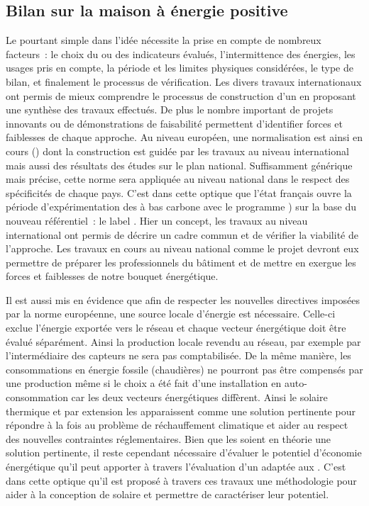 \subsection{Bilan sur la maison à énergie positive} %
\label{sub:bilan_sur_la_BEPOS}
Le  pourtant simple dans l’idée nécessite la prise en compte de nombreux
facteurs~: le choix du ou des indicateurs évalués, l’intermittence des énergies, les
usages pris en compte, la période et les limites physiques considérées, le type de bilan,
et finalement le processus de vérification. Les divers travaux internationaux ont permis
de mieux comprendre le processus de construction d’un  en proposant une
synthèse des travaux effectués. De plus le nombre important de projets innovants ou de
démonstrations de faisabilité permettent d’identifier forces et faiblesses de chaque
approche. Au niveau européen, une normalisation est ainsi en cours ()
dont la construction est guidée par les travaux au niveau international mais aussi des
résultats des études sur le plan national. Suffisamment générique mais précise, cette
norme sera appliquée au niveau national dans le respect des spécificités de chaque pays.
C’est dans cette optique que l’état français ouvre la période d’expérimentation des
 à bas carbone avec le programme ) sur la base du nouveau référentiel~: le label .
Hier un concept, les travaux au niveau international ont permis de décrire un cadre commun
et de vérifier la viabilité de l’approche. Les travaux en cours au niveau national comme
le projet  devront eux permettre de préparer les professionnels du bâtiment
et de mettre en exergue les forces et faiblesses de notre bouquet énergétique.

Il est aussi mis en évidence que afin de respecter les nouvelles directives imposées par
la norme européenne, une source locale d’énergie est nécessaire. Celle-ci exclue l’énergie
exportée vers le réseau et chaque vecteur énergétique doit être évalué séparément. Ainsi
la production locale revendu au réseau, par exemple par l’intermédiaire des capteurs
 ne sera pas comptabilisée. De la même manière, les consommations en énergie
fossile (chaudières) ne pourront pas être compensés par une production
 même si le choix a été fait d’une installation en
auto-consommation car les deux vecteurs énergétiques diffèrent. Ainsi le solaire thermique
et par extension les  apparaissent comme une solution pertinente pour répondre à
la fois au problème de réchauffement climatique et aider au respect des nouvelles
contraintes réglementaires. Bien que les  soient en théorie une solution
pertinente, il reste cependant nécessaire d’évaluer le potentiel d’économie énergétique
qu’il peut apporter à travers l’évaluation d’un  adaptée aux . C’est
dans cette optique qu’il est proposé à travers ces travaux une méthodologie pour aider à
la conception de  solaire et permettre de caractériser leur potentiel.





